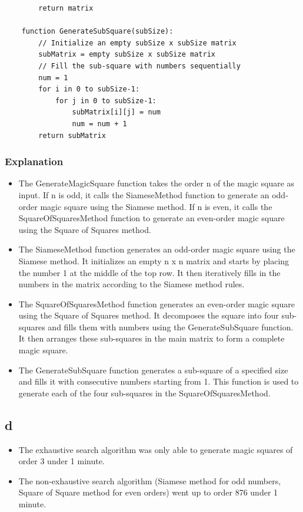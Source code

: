 \documentclass{article}
\begin{document}
\begin{verbatim}
        return matrix
    
    function GenerateSubSquare(subSize):
        // Initialize an empty subSize x subSize matrix
        subMatrix = empty subSize x subSize matrix
        // Fill the sub-square with numbers sequentially
        num = 1
        for i in 0 to subSize-1:
            for j in 0 to subSize-1:
                subMatrix[i][j] = num
                num = num + 1
        return subMatrix
    \end{verbatim}

\subsubsection*{Explanation}
\begin{itemize}
    \item The GenerateMagicSquare function takes the order n of the magic square as input.
          If n is odd, it calls the SiameseMethod function to generate an odd-order magic square
          using the Siamese method. If n is even, it calls the SquareOfSquaresMethod function to
          generate an even-order magic square using the Square of Squares method.

    \item The SiameseMethod function generates an odd-order magic square using the Siamese method.
          It initializes an empty n x n matrix and starts by placing the number 1 at the middle of the
          top row. It then iteratively fills in the numbers in the matrix according to the Siamese
          method rules.

    \item The SquareOfSquaresMethod function generates an even-order magic square using the Square
          of Squares method. It decomposes the square into four sub-squares and fills them with numbers
          using the GenerateSubSquare function. It then arranges these sub-squares in the main matrix
          to form a complete magic square.

    \item The GenerateSubSquare function generates a sub-square of a specified size and fills it with
          consecutive numbers starting from 1. This function is used to generate each of the four
          sub-squares in the SquareOfSquaresMethod.
\end{itemize}

\subsection*{d}
\begin{itemize}
\item The exhaustive search algorithm was only able to generate magic squares of order 3 under 1 minute.
\item The non-exhaustive search algorithm (Siamese method for odd numbers, Square of Square method for even orders)
went up to order 876 under 1 minute.

\end{itemize}




\newpage
\end{document}
